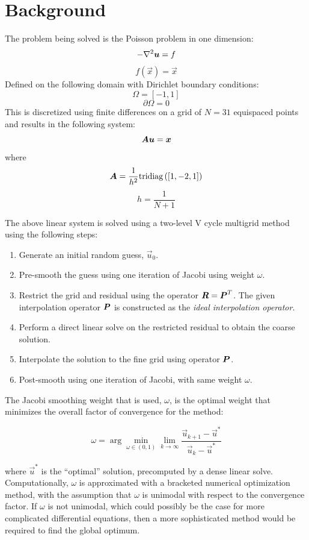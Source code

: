


\section{Background}
The problem being solved is the Poisson problem in one dimension:
$$ -\nabla^2\bm{{u}} = f $$
$$ f(\vec{x}) = \vec{x} $$
Defined on the following domain with Dirichlet boundary conditions:
$$ \Omega = \left[-1, 1\right]$$
$$ \partial\Omega = 0 $$
This is discretized using finite differences on a grid of $N=31$ equispaced points and results in the following system:
$$ \bm{{A}}\bm{{u}} = \bm{{x}} $$
where
$$\bm{{A}} = \frac{1}{h^2} \text{tridiag}\left(\left[1, -2, 1\right]\right)$$
$$h = \frac{1}{N+1}$$

The above linear system is solved using a two-level V cycle multigrid method using the following steps:

\begin{enumerate}
\item Generate an initial random guess, $\vec{u}_0$.
\item Pre-smooth the guess using one iteration of Jacobi using weight $\omega$.
\item Restrict the grid and residual using the operator $\bm{{R}}=\bm{{P}}^T$.  The given interpolation operator $\bm{{P}}$ is constructed as the \textit{ideal interpolation operator}.
\item Perform a direct linear solve on the restricted residual to obtain the coarse solution.
\item Interpolate the solution to the fine grid using operator $\bm{{P}}$.
\item Post-smooth using one iteration of Jacobi, with same weight $\omega$.
\end{enumerate}

The Jacobi smoothing weight that is used, $\omega$, is the optimal weight that minimizes the overall factor of convergence for the method:

$$\omega = \arg \min_{\omega\in\left(0,1\right)} \lim_{k\to\infty} \frac{ \vec{u}_{k+1} - \vec{u}^* }{ \vec{u}_{k} - \vec{u}^* }$$

where $\vec{u}^*$ is the ``optimal'' solution, precomputed by a dense linear solve.  Computationally, $\omega$ is approximated with a bracketed numerical optimization method, with the assumption that $\omega$ is unimodal with respect to the convergence factor.  If $\omega$ is not unimodal, which could possibly be the case for more complicated differential equations, then a more sophisticated method would be required to find the global optimum.

